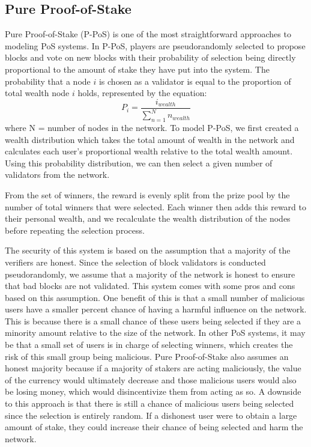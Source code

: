 \subsection{Pure Proof-of-Stake}
Pure Proof-of-Stake (P-PoS) is one of the most straightforward approaches to modeling PoS systems. In P-PoS, players are pseudorandomly selected to propose blocks and vote on new blocks with their probability of selection being directly proportional to the amount of stake they have put into the system. The probability that a node $i$ is chosen as a validator is equal to the proportion of total wealth node $i$ holds, represented by the equation: 
\begin{equation}
P_i = \frac{i_{wealth}}{\sum_{n=1}^{N} n_{wealth}} 
\end{equation}
where N = number of nodes in the network. To model P-PoS, we first created a wealth distribution which takes the total amount of wealth in the network and calculates each user's proportional wealth relative to the total wealth amount. Using this probability distribution, we can then select a given number of validators from the network.

From the set of winners, the reward is evenly split from the prize pool by the number of total winners that were selected. Each winner then adds this reward to their personal wealth, and we recalculate the wealth distribution of the nodes before repeating the selection process.

The security of this system is based on the assumption that a majority of the verifiers are honest. Since the selection of block validators is conducted pseudorandomly, we assume that a majority of the network is honest to ensure that bad blocks are not validated. This system comes with some pros and cons based on this assumption. One benefit of this is that a small number of malicious users have a smaller percent chance of having a harmful influence on the network. This is because there is a small chance of these users being selected if they are a minority amount relative to the size of the network. In other PoS systems, it may be that a small set of users is in charge of selecting winners, which creates the risk of this small group being malicious. Pure Proof-of-Stake also assumes an honest majority because if a majority of stakers are acting maliciously, the value of the currency would ultimately decrease and those malicious users would also be losing money, which would disincentivize them from acting as so. A downside to this approach is that there is still a chance of malicious users being selected since the selection is entirely random. If a dishonest user were to obtain a large amount of stake, they could increase their chance of being selected and harm the network.


